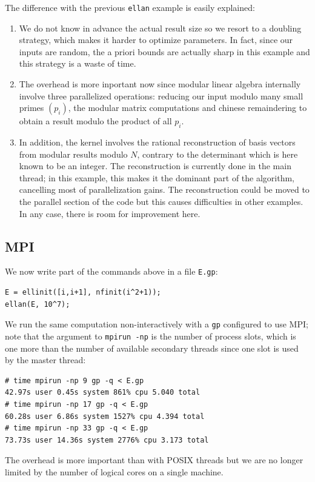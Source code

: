 \documentclass{deliverablereport}
\begin{document}
\noindent The difference with the previous \texttt{ellan} example is easily
explained:
\begin{enumerate}
  \item We do not know in advance the actual result size so we resort to a
    doubling strategy, which makes it harder to optimize parameters.
    In fact, since our inputs are random, the a priori bounds are actually
    sharp in this example and this strategy is a waste of time.

  \item The overhead is more inportant now since modular linear algebra
    internally involve three parallelized operations: reducing our input
    modulo many small primes $(p_i)$, the modular matrix computations and
    chinese remaindering to obtain a result modulo the product of all $p_i$.

  \item In addition, the kernel involves the rational reconstruction of basis
    vectors from modular results modulo $N$, contrary to the determinant
    which is here known to be an integer. The reconstruction is currently
    done in the main thread; in this example, this makes it the dominant part
    of the algorithm, cancelling most of parallelization gains. The
    reconstruction could be moved to the parallel section of the code but
    this causes difficulties in other examples. In any case, there is
    room for improvement here.
\end{enumerate}

\subsection{MPI}

We now write part of the commands above in a file \texttt{E.gp}:
\begin{verbatim}
E = ellinit([i,i+1], nfinit(i^2+1));
ellan(E, 10^7);
\end{verbatim}
We run the same computation non-interactively with a \texttt{gp} configured
to use MPI; note that the argument to \texttt{mpirun -np} is the number of
process slots, which is one more than the number of available secondary
threads since one slot is used by the master thread:
\begin{verbatim}
# time mpirun -np 9 gp -q < E.gp
42.97s user 0.45s system 861% cpu 5.040 total
# time mpirun -np 17 gp -q < E.gp
60.28s user 6.86s system 1527% cpu 4.394 total
# time mpirun -np 33 gp -q < E.gp
73.73s user 14.36s system 2776% cpu 3.173 total
\end{verbatim}
The overhead is more important than with POSIX
threads but we are no longer limited by the number of logical cores on a
single machine.
\end{document}
